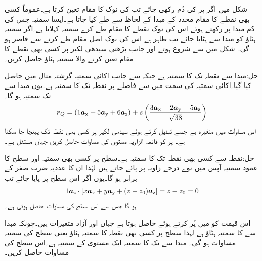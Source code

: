 شکل  میں اگر  پر  کی دُم رکھی جائے تب   کی نوک  کا مقام تعین کرتا ہے۔عموماً کسی بھی نقطے کا مقام محدد کے مبدا  کے لحاظ سے طے کیا جاتا ہے۔ایسا سمتیہ جس کی دُم مبدا پر رکھتے ہوئے اس کی نوک نقطے کا مقام طے کرے   سمتیہ کہلاتا ہے۔اگر سمتیہ ہٹاؤ کو مبدا سے ہٹایا جائے تب ظاہر ہے اس کی نوک اصل مقام طے کرنے سے قاصر ہو گی۔
شکل  میں  سے شروع ہوتے اور   جانب بڑھتی سیدھی لکیر پر کسی بھی نقطے کا مقام تعین کرنے والا سمتیہ ہٹاؤ حاصل کریں۔

حل:مبدا  سے  نقطہ  تک کا سمتیہ  ہے جبکہ  سے  جانب اکائی سمتیہ  گزشتہ مثال میں حاصل کیا گیا۔اکائی سمتیہ  کی سمت میں   سے  فاصلے پر نقطہ  تک کا سمتیہ  ہے۔یوں مبدا سے   تک سمتیہ  ہو گا۔
\begin{align*}
{\ensuremath{{\boldsymbol{r}}}}_Q=(1{\boldsymbol{a}}_{\textup{x}}+5{\boldsymbol{a}}_{\textup{y}}+6{\boldsymbol{a}}_{\textup{z}}) +s \left(\frac{3{\boldsymbol{a}}_{\textup{x}}-2{\boldsymbol{a}}_{\textup{y}}-5{\boldsymbol{a}}_{\textup{z}}}{\sqrt{38}}\right)
\end{align*}   
اس مساوات میں  متغیرہ ہے جسے تبدیل کرتے ہوئے سیدھی لکیر پر کسی بھی نقطہ  تک پہنچا جا سکتا ہے۔
 پر  کو قائمہ الزاویہ مستوی کی مساوات حاصل کریں جہاں  مستقل ہے۔ 

حل:نقطہ  سے کسی بھی نقطہ  تک کا سمتیہ  ہے۔سطح پر کسی بھی سمتیہ اور سطح کا عمود سمتیہ آپس میں نوے درجے زاویہ پر پائے جاتے ہیں لہٰذا ان کا عددیہ ضرب صفر کے برابر ہو گا۔یوں اگر  اس  سطح پر پایا جائے تب
\begin{align*}
1{\boldsymbol{a}}_{\textup{z}} \cdot [x{\boldsymbol{a}}_{\textup{x}}+y{\boldsymbol{a}}_{\textup{y}}+(z-z_0){\boldsymbol{a}}_{\textup{z}}]=z-z_0=0
\end{align*}
ہو گا جس سے اس سطح کی مساوات  حاصل ہوتی ہے۔

اس قیمت کو  میں پُر کرتے ہوئے  حاصل ہوتا ہے جہاں  اور  آزاد متغیرات ہیں۔چونکہ مبدا سے  کا سمتیہ ہٹاؤ  ہے لہٰذا  سطح پر کسی بھی نقطہ  کا سمتیہ ہٹاؤ یعنی سطح کی سمتیہ  مساوات   ہو گی۔
مبدا سے  تک کا سمتیہ ایک مستوی کے  سمتیہ ہے۔اس سطح کی  مساوات حاصل کریں۔

